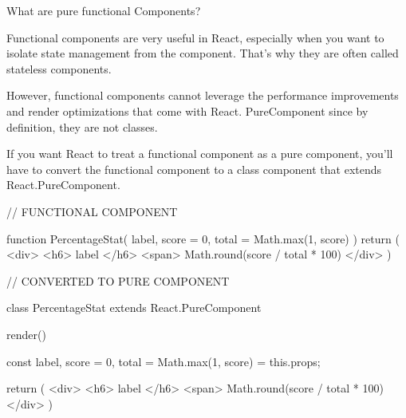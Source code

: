 What are pure functional Components?

Functional components are very useful in React, especially when 
you want to isolate state management from the component. 
That’s why they are often called stateless components.

However, functional components cannot leverage the performance 
improvements and render optimizations that come with React.
PureComponent since by definition, they are not classes.

If you want React to treat a functional component as a 
pure component, you’ll have to convert the functional component 
to a class component that extends React.PureComponent.


// FUNCTIONAL COMPONENT

function PercentageStat({ label, score = 0, total = Math.max(1, score) }) {
  return (
    <div>
      <h6>{ label }</h6>
      <span>{ Math.round(score / total * 100) }%
    </div>
  )
}


// CONVERTED TO PURE COMPONENT

class PercentageStat extends React.PureComponent {

  render() {
    const { label, score = 0, total = Math.max(1, score) } = this.props;

    return (
      <div>
        <h6>{ label }</h6>
        <span>{ Math.round(score / total * 100) }%
      </div>
    )
  }

}